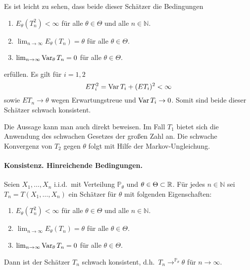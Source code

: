 

Es ist leicht zu sehen, dass beide dieser Schätzer
die Bedingungen 
\begin{enumerate}
    \item $E_\theta(T^2_n)< \infty$ für alle $\theta\in\Theta$ und alle $n\in\mathbb N$.
    \item $\lim_{n\to\infty}E_\theta(T_n) = \theta$ für alle $\theta\in\Theta$.
    \item $\lim_{n\to\infty} \operatorname{Var}_\theta T_n = 0$ für alle $\theta\in\Theta$.
\end{enumerate}
erfüllen. Es gilt für $i=1,2$
\begin{equation*}
    E T_i^2 = \operatorname{Var} T_i + (E T_i)^2 <\infty
\end{equation*}
sowie $E T_n \to \theta$ wegen Erwartungstreue und $\operatorname{Var} T_i \to 0$. Somit sind beide dieser
Schätzer schwach konsistent.

Die Aussage kann man auch direkt beweisen. Im Fall $T_1$ bietet sich die Anwendung
des schwachen Gesetzes der großen Zahl an. Die schwache Konvergenz von $T_2$ gegen $\theta$ 
folgt mit Hilfe der Markov-Ungleichung.





\paragraph{Konsistenz. Hinreichende Bedingungen. }
\label{Konsistenz-Hinreichende-Bedingungen}
Seien $X_1,\ldots,X_n$ i.i.d.\ mit Verteilung $\mathbb P_\theta$ und $\theta\in\Theta\subset\mathbb R$.
Für jedes $n\in\mathbb N$ sei $T_n = T(X_1,\ldots,X_n)$ ein Schätzer für $\theta$ mit 
folgenden Eigenschaften:
\begin{enumerate}
    \item $E_\theta(T^2_n)< \infty$ für alle $\theta\in\Theta$ und alle $n\in\mathbb N$.
    \item $\lim_{n\to\infty}E_\theta(T_n) = \theta$ für alle $\theta\in\Theta$.
    \item $\lim_{n\to\infty} \operatorname{Var}_\theta T_n = 0$ für alle $\theta\in\Theta$.
\end{enumerate}
Dann ist der Schätzer $T_n$ schwach konsistent, d.h.\ $T_n \to^{\mathbb P_\theta} \theta$
für $n\to\infty$.

